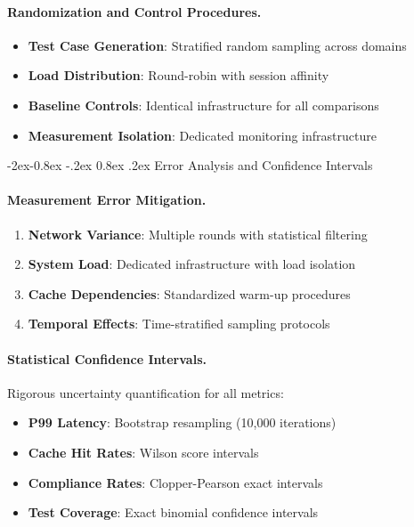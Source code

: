 \documentclass[manuscript,screen,9pt]{acmart}
\makeatletter
\renewcommand\subsubsection{\@startsection{subsubsection}{3}{\z@}%
  {-2ex\@plus -0.8ex \@minus -.2ex}%
  {0.8ex \@plus .2ex}%
  {\normalfont\normalsize\bfseries}}
\makeatother
\begin{document}
\paragraph{Randomization and Control Procedures.}
\begin{itemize}[leftmargin=*,itemsep=1pt,parsep=1pt]
    \item \textbf{Test Case Generation}: Stratified random sampling across domains
    \item \textbf{Load Distribution}: Round-robin with session affinity
    \item \textbf{Baseline Controls}: Identical infrastructure for all comparisons
    \item \textbf{Measurement Isolation}: Dedicated monitoring infrastructure
\end{itemize}

\subsubsection{Error Analysis and Confidence Intervals}
\label{subsubsec:error_analysis}

\paragraph{Measurement Error Mitigation.}
\begin{enumerate}[leftmargin=*,itemsep=1pt,parsep=1pt]
    \item \textbf{Network Variance}: Multiple rounds with statistical filtering
    \item \textbf{System Load}: Dedicated infrastructure with load isolation
    \item \textbf{Cache Dependencies}: Standardized warm-up procedures
    \item \textbf{Temporal Effects}: Time-stratified sampling protocols
\end{enumerate}

\paragraph{Statistical Confidence Intervals.}
Rigorous uncertainty quantification for all metrics:
\begin{itemize}[leftmargin=*,itemsep=1pt,parsep=1pt]
    \item \textbf{P99 Latency}: Bootstrap resampling (10,000 iterations)
    \item \textbf{Cache Hit Rates}: Wilson score intervals
    \item \textbf{Compliance Rates}: Clopper-Pearson exact intervals
    \item \textbf{Test Coverage}: Exact binomial confidence intervals
\end{itemize}
\end{document}
